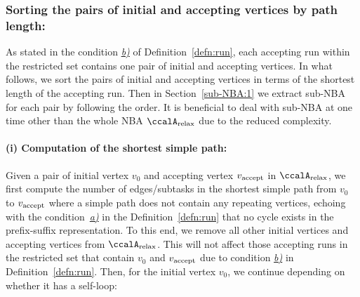 \documentclass[Afour,sageh,times]{sagej}
\newcommand{\auto}[1]{\ccalA_{\textup{#1}}}
\newcommand{\vertex}[1]{v_{\textup{#1}}}
\begin{document}
{%

  \subsubsection{Sorting the pairs of initial and accepting vertices by path length:}\label{sec:sort}  As stated in the condition \hyperref[cond:b]{\it b)} of Definition~\ref{defn:run}, each accepting run within the restricted set  contains  one pair of initial and accepting vertices. In what follows, we sort the pairs of initial and accepting vertices in terms of the shortest length of the accepting run.  Then in Section~\ref{sub-NBA:1} we extract sub-NBA for each pair by following the order. It is beneficial to deal with sub-NBA at one time other than the whole NBA $\auto{relax}$ due to the reduced complexity.
  \paragraph{(i) Computation of the shortest simple path:} Given a pair of initial vertex $v_0$ and accepting vertex $\vertex{accept}$ in $\auto{relax}$, we first compute the number of edges/subtasks in the shortest simple path from  $v_0$ to $\vertex{accept}$ where a simple path does not contain any  repeating vertices, echoing with the condition~\hyperref[cond:a]{\it a)} in the Definition~\ref{defn:run} that no cycle exists in the prefix-suffix representation.
  To this end, we remove all other initial vertices and accepting vertices from $\auto{relax}$. This will not affect those accepting runs in the restricted set that contain $v_0$ and $\vertex{accept}$ due to condition \hyperref[cond:b]{\it b)}  in Definition~\ref{defn:run}.  Then, for the initial vertex $v_0$, we continue depending on whether it has a self-loop:
}
\end{document}
